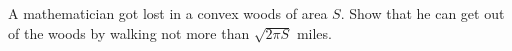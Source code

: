 A mathematician got lost in a convex woods of area $S$. Show that he can get out of the woods by walking not more than $\sqrt{2\pi S}$ miles.
